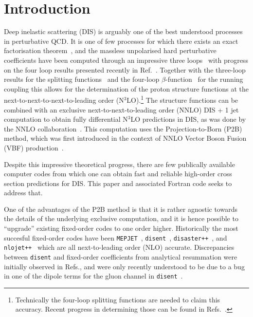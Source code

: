 \documentclass[submission, PhysCodeb]{SciPost}
\newcommand{\disent}{{\tt disent}}
\newcommand{\nnlojet}{NNLO{\sc{jet}}}
\newcommand{\disaster}{{\tt disaster++}}
\newcommand{\nlojet}{{\tt nlojet++}}
\newcommand{\NNNLO}{N$^3$LO}
\begin{document}
\section{Introduction}
\label{sec:intro}
Deep inelastic scattering (DIS) is arguably one of the best understood
processes in perturbative QCD. It is one of few processes for which
there exists an exact factorisation
theorem~\cite{Collins:1987pm,Collins:1989gx}, and the massless
unpolarised hard perturbative coefficients have been computed through
an impressive three
loops~\cite{SanchezGuillen:1990iq,vanNeerven:1991nn,Zijlstra:1992qd,Zijlstra:1992kj,vanNeerven:1999ca,vanNeerven:2000uj,Moch:1999eb,Moch:2004xu,Vermaseren:2005qc,Vogt:2006bt,Moch:2007rq,Davies:2016ruz,Blumlein:2022gpp}
with progress on the four loop results presented recently in
Ref.~\cite{Moch:2022frw}. Together with the three-loop results for the
splitting functions~\cite{Moch:2004pa,Vogt:2004mw} and the four-loop
$\beta$-function~\cite{vanRitbergen:1997va,Czakon:2004bu} for the
running coupling this allows for the determination of the proton
structure functions at the next-to-next-to-next-to-leading order
(\NNNLO{}).\footnote{Technically the four-loop splitting functions are
needed to claim this accuracy. Recent progress in determining those
can be found in
Refs.~\cite{Moch:2021qrk,Falcioni:2023luc,Falcioni:2023vqq,Gehrmann:2023cqm}.}
The structure functions can be combined with an exclusive
next-to-next-to-leading order (NNLO) DIS + 1 jet computation to obtain
fully differential \NNNLO{} predictions in DIS, as was done by the \nnlojet{}
collaboration~\cite{Currie:2018fgr,Gehrmann:2018odt}. This computation
uses the Projection-to-Born (P2B) method, which was first introduced
in the context of NNLO Vector Boson Fusion (VBF)
production~\cite{Cacciari:2015jma}.

Despite this impressive theoretical progress, there are few publically
available computer codes from which one can obtain fast and reliable
high-order cross section predictions for DIS. This paper and
associated Fortran code seeks to address that.

One of the advantages of the P2B method is that it is rather agnostic
towards the details of the underlying exclusive computation, and it is
hence possible to ``upgrade'' existing fixed-order codes to one order
higher. Historically the most succesful fixed-order codes have been
{\tt MEPJET}~\cite{Mirkes:1995ks}, \disent{}~\cite{Catani:1996vz},
\disaster{}~\cite{Graudenz:1997gv}, and \nlojet{}~\cite{Nagy:2001xb}
which are all next-to-leading order (NLO) accurate. Discrepancies
between \disent{} and fixed-order coefficients from analytical
resummation were initially observed in
Refs.\cite{Antonelli:1999kx,Dasgupta:2002dc}, and were only recently
understood to be due to a bug in one of the dipole terms for the gluon
channel in \disent{}~\cite{Borsa:2020ulb,Borsa:2020yxh}.
\end{document}
